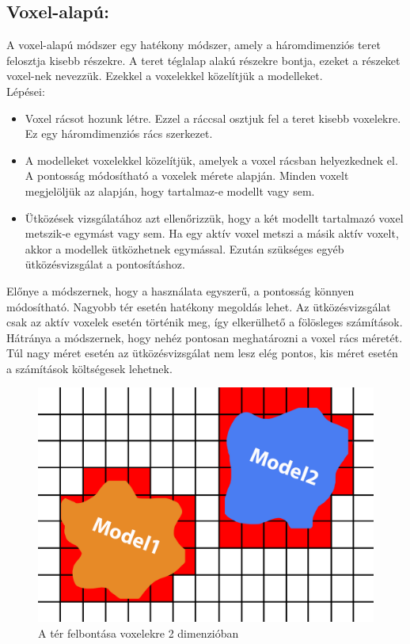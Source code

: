 \subsection{Voxel-alapú:}
A voxel-alapú módszer egy hatékony módszer, amely a háromdimenziós teret felosztja kisebb részekre. A teret téglalap alakú részekre bontja, ezeket a részeket voxel-nek nevezzük.
Ezekkel a voxelekkel közelítjük a modelleket.
\\
Lépései:
\begin{itemize}
\item Voxel rácsot hozunk létre. Ezzel a ráccsal osztjuk fel a teret kisebb voxelekre. Ez egy háromdimenziós rács szerkezet.

\item A modelleket voxelekkel közelítjük, amelyek a voxel rácsban helyezkednek el. A pontosság módosítható a voxelek mérete alapján. Minden voxelt megjelöljük az alapján, hogy tartalmaz-e modellt vagy sem.

\item Ütközések vizsgálatához azt ellenőrizzük, hogy a két modellt tartalmazó voxel metszik-e egymást vagy sem. Ha egy aktív voxel metszi a másik aktív voxelt, akkor a modellek ütközhetnek egymással. Ezután szükséges egyéb ütközésvizsgálat a pontosításhoz.
\end{itemize}
Előnye a módszernek, hogy a használata egyszerű, a pontosság könnyen módosítható. Nagyobb tér esetén hatékony megoldás lehet. Az ütközésvizsgálat csak az aktív voxelek esetén történik meg, így elkerülhető a fölösleges számítások.\\
Hátránya a módszernek, hogy nehéz pontosan meghatározni a voxel rács méretét. Túl nagy méret esetén az ütközésvizsgálat nem lesz elég pontos, kis méret esetén a számítások költségesek lehetnek.
\begin{figure}[h]
	\centering
	\includegraphics[width=13truecm, height=7.5truecm]{images/con3.png}
	\caption{A tér felbontása voxelekre 2 dimenzióban}
	\label{fig:con_3}
\end{figure}

